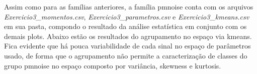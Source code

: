\clearpage

\begin{figure}[ht!]
	\vspace{0mm}	%
	\begin{center}
	\end{center}
	\vspace{-2mm}	%
	\label{ex3_fig2}
\end{figure}

Assim como para as famílias anteriores, a família pmnoise conta com os arquivos \textit{Exercicio3\_momentos.csv},  \textit{Exercicio3\_parametros.csv} e \textit{Exercicio3\_kmeans.csv} em sua pasta, compondo o resultado da análise estatística em conjunto com os demais plots. Abaixo estão os resultados do agrupamento no espaço via kmeans. Fica evidente que há pouca variabilidade de cada sinal no espaço de parâmetros usado, de forma que o agrupamento não permite a caracterização de classes do grupo pmnoise no espaço composto por variância, skewness e kurtosis.


